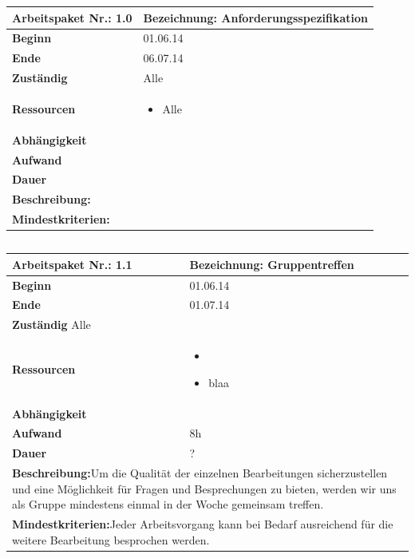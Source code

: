 \documentclass[fontsize=12pt,paper=a4,twoside]{scrartcl}
\begin{document}
\begin{tabular}{|p{5.3cm}|p{9.7cm}|}\hline
	\textbf{Arbeitspaket Nr.:} 1.0 & \textbf{Bezeichnung:} Anforderungsspezifikation\\ \hline \hline
	\textbf{Beginn} & 01.06.14\\ \hline
	\textbf{Ende} & 06.07.14\\ \hline
	\textbf{Zuständig} & Alle\\ \hline
	\textbf{Ressourcen} & \begin{itemize}
		\item Alle
	\end{itemize}    \\ \hline
	\textbf{Abhängigkeit} &\\ \hline
	\textbf{Aufwand} & \\ \hline
	\textbf{Dauer} & \\ \hline
	\multicolumn{2}{|p{15cm}|}{\textbf{Beschreibung:}\newline   }\\ \hline
	\multicolumn{2}{|p{15cm}|}{\textbf{Mindestkriterien:}\newline }\\ \hline
\end{tabular}

\begin{verbatim} 
\end{verbatim}

\begin{tabular}{|p{5.3cm}|p{9.7cm}|}\hline
	\textbf{Arbeitspaket Nr.:} 1.1 & \textbf{Bezeichnung:} Gruppentreffen\\ \hline \hline
	\textbf{Beginn} & 01.06.14\\ \hline
	\textbf{Ende} &  01.07.14\\ \hline
	\textbf{Zuständig} Alle \\ \hline
	\textbf{Ressourcen} & \begin{itemize}
		\item 
		\item blaa
	\end{itemize}    \\ \hline
	\textbf{Abhängigkeit} &\\ \hline
	\textbf{Aufwand} & 8h\\ \hline
	\textbf{Dauer} & ?\\ \hline
	\multicolumn{2}{|p{15cm}|}{\textbf{Beschreibung:}\newline  Um die Qualität der einzelnen Bearbeitungen sicherzustellen und eine Möglichkeit für Fragen und Besprechungen zu bieten, werden wir uns als Gruppe mindestens einmal in der Woche gemeinsam treffen. }\\ \hline
	\multicolumn{2}{|p{15cm}|}{\textbf{Mindestkriterien:}\newline Jeder Arbeitsvorgang kann bei Bedarf ausreichend für die weitere Bearbeitung besprochen werden. }\\ \hline
\end{tabular}
\end{document}
